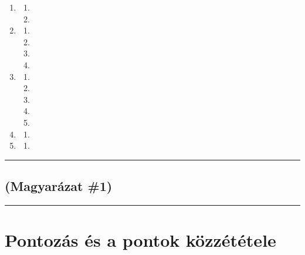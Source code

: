 \documentclass[]{report}
\newenvironment{expl}[0]%
  {\rule{\textwidth}{.2pt}\footnotesize}%
  {\rule{\textwidth}{.2pt}\normalsize}
\begin{document}
\begin{enumerate}
\item

    \begin{enumerate}
    \item
    
    \item
    
    \end{enumerate}
\item

    \begin{enumerate}
    \item
    
    \item
    
    \item
    
    \item
    
    \end{enumerate}
\item

    \begin{enumerate}
    \item
    
    \item
    
    \item
    
    \item
    
    \item
    
    \end{enumerate}
\item

    \begin{enumerate}
    \item
    
    \end{enumerate}
\item

    \begin{enumerate}
    \item
    
    \end{enumerate}
\end{enumerate}

\begin{expl}
\section*{(Magyarázat \#1)}


\end{expl}


\chapter{Pontozás és a pontok közzététele}
\end{document}
